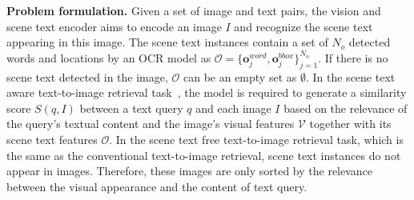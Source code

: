 \documentclass[10pt,twocolumn,letterpaper]{article}
\begin{document}
\noindent \textbf{Problem formulation.} Given a set of image and text pairs, the vision and scene text encoder aims to encode an image $I$ and recognize the scene text appearing in this image. The scene text instances contain a set of $N_o$ detected words and locations by an OCR model as $\mathcal{O} = \{\mathbf{o}^{word}_j,\mathbf{o}^{bbox}_j\}_{j=1}^{N_o}$. If there is no scene text detected in the image, $\mathcal{O}$ can be an empty set as $\emptyset$. In the scene text aware text-to-image retrieval task~\cite{STARNet}, the model is required to generate a similarity score  $S(q,I)$ between a text query $q$ and each image $I$ based on the relevance of the query's textual content and the image's visual features $\mathcal{V}$ together with its scene text features $\mathcal{O}$. In the scene text free text-to-image retrieval task, which is the same as the conventional text-to-image retrieval, scene text instances do not appear in images. Therefore, these images are only sorted by the relevance between the visual appearance and the content of text query.
\end{document}
